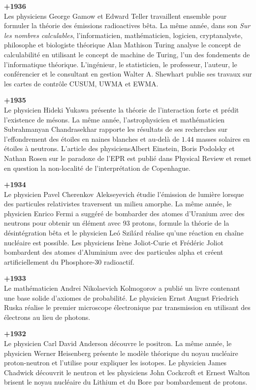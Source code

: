 \textbf{+1936}\\
Les physiciens George Gamow et Edward Teller travaillent ensemble pour formuler la théorie des émissions radioactives bêta. La même année, dans son \textit{Sur les nombres calculables}, l'informaticien, mathématicien, logicien, cryptanalyste, philosophe et biologiste théorique Alan Mathison Turing analyse le concept de calculabilité en utilisant le concept de machine de Turing, l'un des fondements de l'informatique théorique. L'ingénieur, le statisticien, le professeur, l'auteur, le conférencier et le consultant en gestion Walter A. Shewhart publie ses travaux sur les cartes de contrôle CUSUM, UWMA et EWMA.

\textbf{+1935}\\
Le physicien Hideki Yukawa présente la théorie de l'interaction forte et prédit l'existence de mésons. La même année, l'astrophysicien et mathématicien Subrahmanyan Chandrasekhar rapporte les résultats de ses recherches sur l'effondrement des étoiles en naines blanches et au-delà de $1.44$ masses solaires en étoiles à neutrons. L'article des physiciensAlbert Einstein, Boris Podolsky et Nathan Rosen sur le paradoxe de l'EPR est publié dans Physical Review et remet en question la non-localité de l'interprétation de Copenhague.

\textbf{+1934}\\
Le physicien Pavel Cherenkov Alekseyevich étudie l'émission de lumière lorsque des particules relativistes traversent un milieu amorphe. La même année, le physicien Enrico Fermi a suggéré de bombarder des atomes d'Uranium avec des neutrons pour obtenir un élément avec 93 protons, formule la théorie de la désintégration bêta et le physicien Leó Szilárd réalise qu'une réaction en chaîne nucléaire est possible. Les physiciens Irène Joliot-Curie et Frédéric Joliot bombardent des atomes d'Aluminium avec des particules alpha et créent artificiellement du Phosphore-30 radioactif.

\textbf{+1933}\\
Le mathématicien Andrei Nikolaevich Kolmogorov a publié un livre contenant une base solide d'axiomes de probabilité. Le physicien Ernst August Friedrich Ruska réalise le premier microscope électronique par transmission en utilisant des électrons au lieu de photons.

\textbf{+1932}\\
Le physicien Carl David Anderson découvre le positron. La même année, le physicien Werner Heisenberg présente le modèle théorique du noyau nucléaire proton-neutron et l'utilise pour expliquer les isotopes. Le physicien James Chadwick découvrit le neutron et les physiciens John Cockcroft et Ernest Walton brisent le noyau nucléaire du Lithium et du Bore par bombardement de protons.

